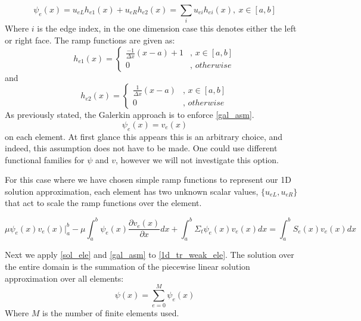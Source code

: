\begin{equation}
\psi_e(x) = u_{eL}h_{e1}(x) + u_{eR}h_{e2}(x) = \sum_i u_{ei} h_{ei}(x),\ x\in[a,b]
\label{sol_ele}
\end{equation}
Where $i$ is the edge index, in the one dimension case this denotes either the left or right face.
The ramp functions are given as:
\begin{equation}
  h_{e1}(x) =
  \begin{cases}
                                   \frac{-1}{\Delta x}(x-a) + 1 & \text{, $x\in[a,b]$} \\
                                   0 & \text{, $otherwise$} 
  \end{cases}
\end{equation}
and
\begin{equation}
  h_{e2}(x) =
  \begin{cases}
                                   \frac{1}{\Delta x}(x-a) & \text{, $x\in[a,b]$} \\
                                   0 & \text{, $otherwise$} 
  \end{cases}
\end{equation}
As previously stated, the Galerkin approach is to enforce \ref{gal_asm}.
\begin{equation}
\psi_e(x) = v_e(x)
\label{gal_asm}
\end{equation}
on each element.  At first glance this appears this is an arbitrary choice, and indeed, this assumption does not have to be made.  One could use different functional families for $\psi$ and $v$, however we will not investigate this option.

For this case where we have chosen simple ramp functions to represent our 1D solution approximation, each element has two unknown scalar values, $\{u_{eL}, u_{eR}\}$ that act to scale the ramp functions over the element.

\begin{equation}
\mu \psi_e(x)v_e(x)|_a^b- \mu \int_a^b  \psi_e(x) \frac{\partial v_e(x)}{\partial x} dx + \int_a^b \Sigma_t \psi_e(x)v_e(x) dx =  \int_a^b S_e(x)v_e(x) dx
\label{1d_tr_weak_ele}
\end{equation}

Next we apply \ref{sol_ele} and \ref{gal_asm} to \ref{1d_tr_weak_ele}.
The solution over the entire domain is the summation of the piecewise linear solution approximation over all elements:
\begin{equation}
\psi(x) = \sum_{e=0}^M \psi_e(x) 
\end{equation} 
Where $M$ is the number of finite elements used.
 
